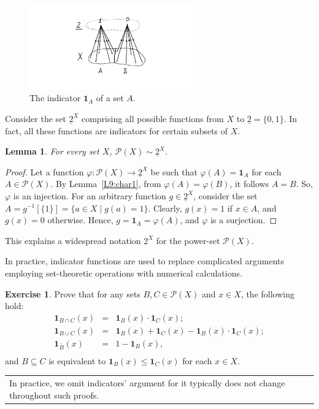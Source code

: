 \documentclass[12pt,notitlepage]{article}
\theoremstyle{plain}
\newtheorem{lemma}[thm]{Lemma}
\theoremstyle{definition}
\newtheorem{exc}[thm]{Exercise}
\theoremstyle{plain}
\newcommand{\sbs}{\subseteq}
\newcommand{\mP}{\mathcal{P}}
\renewcommand{\phi}{\varphi}
\newcommand{\ul}[1]{\underline{#1}}
\newcommand{\1}{\mathbf{1}}
\newcommand{\0}{\mathbf{0}}
\newcommand{\mcomm}[1]{
\medskip\noindent\begin{tabular}{| l}
\parbox{0.99\textwidth}{{\small
#1 }}\end{tabular}
\smallskip}
\begin{document}
\begin{figure}[h]
\centering
\includegraphics*[width=0.65\textwidth]{ind_func.pdf}
\caption{The indicator $\1_A$ of a set $A$.}
\end{figure}

Consider the set $\ul{2}^X$ comprising all possible functions from $X$ to $\ul{2} = \{0, 1\}$. In fact, all these functions are indicators for certain subsets of $X$.
\begin{lemma}\label{L9:char2}
For every set $X$, $\mP(X) \sim \ul{2}^X$.
\end{lemma}
\begin{proof} 
Let a function $\phi\colon \mP(X) \to \ul{2}^X$ be such that $\phi(A) = \1_A$ for each $A \in \mP(X)$. By  Lemma~\ref{L9:char1}, from $\phi(A) = \phi(B)$, it follows $A = B$. So, $\phi$ is an injection. For an arbitrary function $g \in \ul{2}^X$, consider the set $A = g^{-1}[\{ 1 \}] = \{ a \in X \mid g(a) = 1 \}$. Clearly, $g(x) = 1$ if $x \in A$, and $g(x) = 0$ otherwise. Hence, $g = \1_A = \phi(A)$, and $\phi$ is a surjection.
\end{proof}
\noindent This explains a widespread notation $2^X$ for the power-set $\mP(X)$.

In practice, indicator functions are used to replace complicated arguments employing set-theoretic operations with numerical calculations.
\begin{exc}
Prove that for any sets $B,C \in \mP(X)$ and $x \in X$, the following hold:
$$
\begin{array}{rcl}
\1_{B \cap C}(x) &=& \1_B(x) \cdot \1_C(x);\\
\1_{B \cup C}(x) &=& \1_B(x) + \1_C(x) - \1_B(x) \cdot \1_C(x);\\
\1_{\bar B}(x) &=& 1 - \1_B(x),\\
\end{array}$$
and $B \sbs C$ is equivalent to $\1_B(x) \leq \1_C(x)$ for each $x \in X$.
\end{exc}

\mcomm{In practice, we omit indicators' argument for it typically does not change throughout such proofs.}
\end{document}

